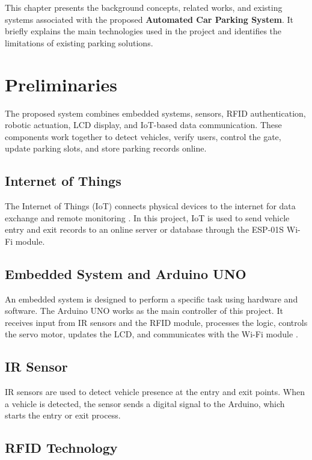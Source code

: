 
This chapter presents the background concepts, related works, and existing systems associated with the proposed \textbf{Automated Car Parking System}. It briefly explains the main technologies used in the project and identifies the limitations of existing parking solutions.

\section{Preliminaries}

The proposed system combines embedded systems, sensors, RFID authentication, robotic actuation, LCD display, and IoT-based data communication. These components work together to detect vehicles, verify users, control the gate, update parking slots, and store parking records online.

\subsection{Internet of Things}

The Internet of Things (IoT) connects physical devices to the internet for data exchange and remote monitoring \cite{b7}. In this project, IoT is used to send vehicle entry and exit records to an online server or database through the ESP-01S Wi-Fi module.

\subsection{Embedded System and Arduino UNO}

An embedded system is designed to perform a specific task using hardware and software. The Arduino UNO works as the main controller of this project. It receives input from IR sensors and the RFID module, processes the logic, controls the servo motor, updates the LCD, and communicates with the Wi-Fi module \cite{b9}.

\subsection{IR Sensor}

IR sensors are used to detect vehicle presence at the entry and exit points. When a vehicle is detected, the sensor sends a digital signal to the Arduino, which starts the entry or exit process.

\subsection{RFID Technology}


